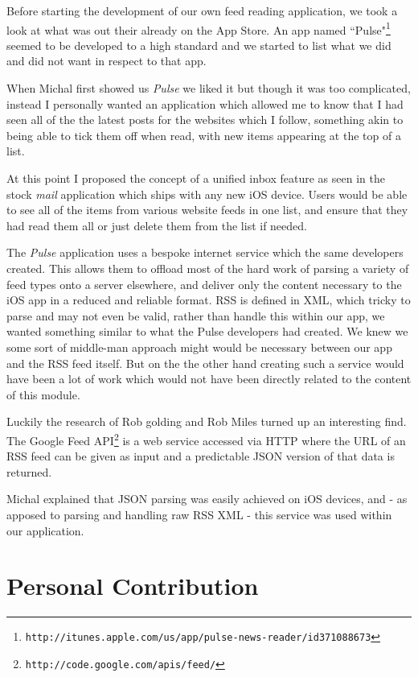 \documentclass[a4paper,11pt]{article}
\begin{document}
	Before starting the development of our own feed reading application, we
	took a look at what was out their already on the App Store. An app named
	``Pulse"\footnote{
	\texttt{http://itunes.apple.com/us/app/pulse-news-reader/id371088673}}
	seemed to be developed to a high standard and we started to list what we
	did and did not want in respect to that app.
	
	When Michal first showed us \emph{Pulse} we liked it but though it was
	too complicated, instead I personally wanted an application which allowed
	me to know that I had seen all of the the latest posts for the websites
	which I follow, something akin to being able to tick them off when read,
	with new items appearing at the top of a list.
	
	At this point I proposed the concept of a unified inbox feature as seen in
	the stock \emph{mail} application which ships with any new iOS device.
	Users would be able to see all of the items from various website feeds in
	one list, and ensure that they had read them all or just delete them from
	the list if needed.
	
	The \emph{Pulse} application uses a bespoke internet service which the
	same developers created. This allows them to offload most of the hard work
	of parsing a variety of feed types onto a server elsewhere, and deliver
	only the content necessary to the iOS app in a reduced and reliable
	format. RSS is defined in XML, which tricky to parse and may not even be
	valid, rather than handle this within our app, we wanted something similar
	to what the Pulse developers had created. We knew we some sort of
	middle-man approach might would be necessary between our app and the RSS
	feed itself. But on the the other hand creating such a service would have
	been a lot of work which would not have been directly related to the
	content of this module.
	
	Luckily the research of Rob golding and Rob Miles turned up an interesting
	find. The Google Feed 
	API\footnote{\texttt{http://code.google.com/apis/feed/}} is a web service
	accessed via HTTP where the URL of an RSS feed can be given as input and a
	predictable JSON version of that data is returned.
	
	Michal explained that JSON parsing was easily achieved on iOS devices, and
	- as apposed to parsing and handling raw RSS XML - this service was used
	within our application.
	
	\section{Personal Contribution}
	
\end{document}
